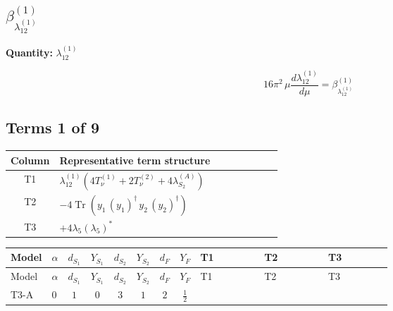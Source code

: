 \documentclass[8pt]{article}
\begin{document}
\begin{landscape}
\section*{$\beta_{\lambda_{12}^{(1)}}^{(1)}$}
\noindent\textbf{Quantity: }$\lambda_{12}^{(1)}$\par\smallskip
\[16\pi^2\,\mu\frac{d \lambda_{12}^{(1)}}{d\mu}=\beta_{\lambda_{12}^{(1)}}^{(1)}\]
\subsection*{Terms 1 of 9}
\begin{center}
\begin{tabular}{@{}c >{\raggedright\arraybackslash}p{0.82\linewidth}@{}}
\toprule
Column & Representative term structure \\
\midrule
T1 & \(\displaystyle {\lambda_{12}^{(1)}} (4 T_{\nu}^{(1)}+2 T_{\nu}^{(2)}+4 {\lambda_{S_2}^{(A)}})\) \\
\midrule
T2 & \(\displaystyle -4 \operatorname{Tr}\!\left({y_1}\,\left({y_1}\right)^{\dagger}\,{y_2}\,\left({y_2}\right)^{\dagger}\right)\) \\
\midrule
T3 & \(\displaystyle +4 {\lambda_5} \left({\lambda_5}\right)^{*}\) \\
\midrule
\bottomrule
\end{tabular}
\end{center}
\smallskip
\tiny
\begin{longtable}{@{}llcccccc >{\raggedright\arraybackslash}p{0.21\linewidth} >{\raggedright\arraybackslash}p{0.21\linewidth} >{\raggedright\arraybackslash}p{0.21\linewidth}@{}}
\toprule
Model & $\alpha$ & $d_{S_1}$ & $Y_{S_1}$ & $d_{S_2}$ & $Y_{S_2}$ & $d_F$ & $Y_F$ & T1 & T2 & T3 \\
\midrule
\endfirsthead
\toprule
Model & $\alpha$ & $d_{S_1}$ & $Y_{S_1}$ & $d_{S_2}$ & $Y_{S_2}$ & $d_F$ & $Y_F$ & T1 & T2 & T3 \\
\midrule
\endhead
T3-A & $0$ & $1$ & $0$ & $3$ & $1$ & $2$ & $\frac{1}{2}$ & \scriptsize\adjustbox{max width=\linewidth}{$\begin{gathered} {\lambda_{12}^{(1)}} (4 T_{\nu}^{(1)}+2 T_{\nu}^{(2)}+4 {\lambda_{S_2}^{(A)}})\end{gathered}$} & \scriptsize\adjustbox{max width=\linewidth}{$\begin{gathered} -4 \operatorname{Tr}\!\left({y_1}\,\left({y_1}\right)^{\dagger}\,{y_2}\,\left({y_2}\right)^{\dagger}\right)\end{gathered}$} & \scriptsize\adjustbox{max width=\linewidth}{$\begin{gathered} +4 {\lambda_5} \left({\lambda_5}\right)^{*}\end{gathered}$} \\

\end{longtable}
\end{landscape}
\end{document}
